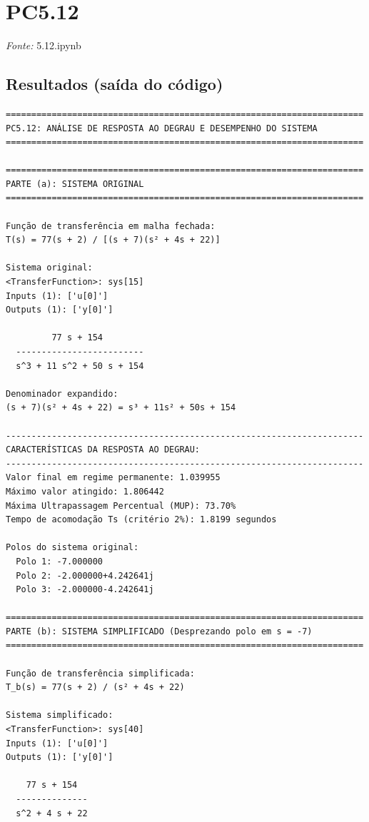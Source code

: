 \documentclass[12pt,a4paper]{article}
\begin{document}
\clearpage
\section*{PC5.12}
\noindent\textit{Fonte:} 5.12.ipynb
\vspace{0.4cm}
\subsection*{Resultados (saída do código)}
\begin{lstlisting}
======================================================================
PC5.12: ANÁLISE DE RESPOSTA AO DEGRAU E DESEMPENHO DO SISTEMA
======================================================================

======================================================================
PARTE (a): SISTEMA ORIGINAL
======================================================================

Função de transferência em malha fechada:
T(s) = 77(s + 2) / [(s + 7)(s² + 4s + 22)]

Sistema original:
<TransferFunction>: sys[15]
Inputs (1): ['u[0]']
Outputs (1): ['y[0]']

         77 s + 154
  -------------------------
  s^3 + 11 s^2 + 50 s + 154

Denominador expandido:
(s + 7)(s² + 4s + 22) = s³ + 11s² + 50s + 154

----------------------------------------------------------------------
CARACTERÍSTICAS DA RESPOSTA AO DEGRAU:
----------------------------------------------------------------------
Valor final em regime permanente: 1.039955
Máximo valor atingido: 1.806442
Máxima Ultrapassagem Percentual (MUP): 73.70%
Tempo de acomodação Ts (critério 2%): 1.8199 segundos

Polos do sistema original:
  Polo 1: -7.000000
  Polo 2: -2.000000+4.242641j
  Polo 3: -2.000000-4.242641j

======================================================================
PARTE (b): SISTEMA SIMPLIFICADO (Desprezando polo em s = -7)
======================================================================

Função de transferência simplificada:
T_b(s) = 77(s + 2) / (s² + 4s + 22)

Sistema simplificado:
<TransferFunction>: sys[40]
Inputs (1): ['u[0]']
Outputs (1): ['y[0]']

    77 s + 154
  --------------
  s^2 + 4 s + 22


\end{lstlisting}
\end{document}
